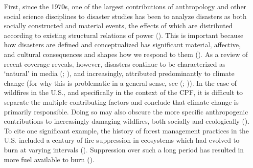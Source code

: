 \documentclass[
]{article}
\begin{document}
First, since the 1970s, one of the largest contributions of anthropology and other social science disciplines to disaster studies has been to analyze disasters as both socially constructed and material events, the effects of which are distributed according to existing structural relations of power (). This is important because how disasters are defined and conceptualized has significant material, affective, and cultural consequences and shapes how we respond to them (). As a review of recent coverage reveals, however, disasters continue to be characterized as `natural' in media (; ), and increasingly, attributed predominantly to climate change (for why this is problematic in a general sense, see (; )). In the case of wildfires in the U.S., and specifically in the context of the CPF, it is difficult to separate the multiple contributing factors and conclude that climate change is primarily responsible. Doing so may also obscure the more specific anthropogenic contributions to increasingly damaging wildfires, both socially and ecologically (). To cite one significant example, the history of forest management practices in the U.S. included a century of fire suppression in ecosystems which had evolved to burn at varying intervals (). Suppression over such a long period has resulted in more fuel available to burn ().
\end{document}

